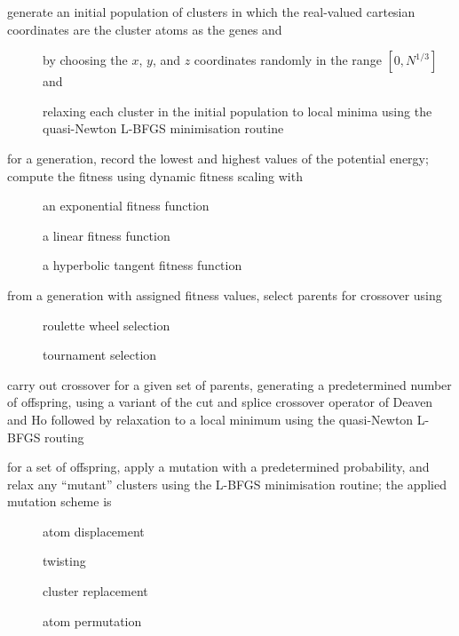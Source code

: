\begin{description}
  \item[] generate an initial population of clusters in which the real-valued cartesian coordinates 
    are the cluster atoms as the genes and
    \begin{description}
      \item[] by choosing the $x$, $y$, and $z$ coordinates randomly in the range $[0,N^{1/3}]$ and 
      \item[] relaxing each cluster in the initial population to local minima using the 
        quasi-Newton L-BFGS minimisation routine
    \end{description}
  \item[] for a generation, record the lowest and highest values of the potential energy; compute the fitness 
    using dynamic fitness scaling with
    \begin{description}
      \item[] an exponential fitness function
      \item[] a linear fitness function
      \item[] a hyperbolic tangent fitness function
    \end{description}
  \item from a generation with assigned fitness values, select parents for crossover using
    \begin{description}
      \item[] roulette wheel selection
      \item[] tournament selection
    \end{description}
  \item[\req{4}] carry out crossover for a given set of parents, generating a predetermined number of offspring, 
    using a variant of the cut and splice crossover operator of Deaven and Ho followed by relaxation to a local
    minimum using the quasi-Newton L-BFGS routing
  \item for a set of offspring, apply a mutation with a predetermined probability, and relax any ``mutant'' clusters
    using the L-BFGS minimisation routine; the applied mutation scheme is
    \begin{description}
      \item[] atom displacement
      \item[] twisting
      \item[] cluster replacement
      \item[] atom permutation

\end{description}
\end{description}
